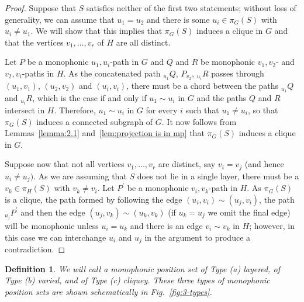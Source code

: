 \documentclass[12pt]{article}
\newtheorem{definition}[theorem]{Definition}
\begin{document}
\begin{proof}
  Suppose that $S$ satisfies neither of the first two statements; without loss of generality, we can assume that $u_1 = u_2$ and there is some $u_i \in \pi _G(S)$ with $u_i \not = u_1$. We will show that this implies that $\pi _G(S)$ induces a clique in $G$ and that the vertices $v_1,\dots ,v_{r}$ of $H$ are all distinct. 

  Let $P$ be a monophonic $u_1,u_i$-path in $G$ and $Q$ and $R$ be monophonic $v_1,v_2$- and $v_2,v_i$-paths in $H$. As the concatenated path $_{u_1}Q$, $P_{v_2}$, $_{u_i}R$ passes through $(u_1,v_1)$, $(u_2,v_2)$ and $(u_i,v_i)$, there must be a chord between the paths $_{u_1}Q$ and $_{u_i}R$, which is the case if and only if $u_1 \sim u_i$ in $G$ and the paths $Q$ and $R$ intersect in $H$. Therefore, $u_1\sim u_i$ in $G$ for every $i$ such that $u_1\ne u_i$, so that $\pi _G(S)$ induces a connected subgraph of $G$. It now follows from Lemmas~\ref{lemma:2.1} and~\ref{lem:projection is in mp} that $\pi _G(S)$ induces a clique in $G$. 

  Suppose now that not all vertices $v_1,\dots ,v_{r}$ are distinct, say $v_i = v_j$ (and hence $u_i \not = u_j)$. As we are assuming that $S$ does not lie in a single layer, there must be a $v_k \in \pi_H (S)$ with $v_k \not = v_i$. Let $P^{\prime }$ be a monophonic $v_i,v_k$-path in $H$. As $\pi _G(S)$ is a clique, the path formed by following the edge $(u_i,v_i) \sim (u_j,v_i)$, the path $_{u_j}P^{\prime }$ and then the edge $(u_j,v_k) \sim (u_k,v_k)$ (if $u_k = u_j$ we omit the final edge) will be monophonic unless $u_i = u_k$ and there is an edge $v_i \sim v_k$ in $H$; however, in this case we can interchange $u_i$ and $u_j$ in the argument to produce a contradiction.
\end{proof}

\begin{definition}
We will call a monophonic position set of Type (a) \emph{layered}, of Type (b) \emph{varied}, and of Type (c) \emph{cliquey}. These three types of monophonic position sets are shown schematically in Fig.~\ref{fig:3-types}. 
\end{definition}
\end{document}
